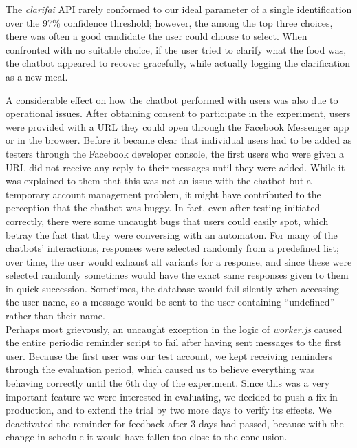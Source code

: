 The \textit{clarifai} API rarely conformed to our ideal parameter of a single identification over the 97\% confidence threshold; however, the among the top three choices, there was often a good candidate the user could choose to select. When confronted with no suitable choice, if the user tried to clarify what the food was, the chatbot appeared to recover gracefully, while actually logging the clarification as a new meal. 

A considerable effect on how the chatbot performed with users was also due to operational issues. After obtaining consent to participate in the experiment, users were provided with a URL they could open through the Facebook Messenger app or in the browser. Before it became clear that individual users had to be added as testers through the Facebook developer console, the first users who were given a URL did not receive any reply to their messages until they were added. While it was explained to them that this was not an issue with the chatbot but a temporary account management problem, it might have contributed to the perception that the chatbot was buggy. In fact, even after testing initiated correctly, there were some uncaught bugs that users could easily spot, which betray the fact that they were conversing with an automaton. For many of the chatbots' interactions, responses were selected randomly from a predefined list; over time, the user would exhaust all variants for a response, and since these were selected randomly sometimes would have the exact same responses given to them in quick succession. Sometimes, the database would fail silently when accessing the user name, so a message would be sent to the user containing ``undefined'' rather than their name. \\
Perhaps most grievously, an uncaught exception in the logic of \textit{worker.js} caused the entire periodic reminder script to fail after having sent messages to the first user. Because the first user was our test account, we kept receiving reminders through the evaluation period, which caused us to believe everything was behaving correctly until the 6th day of the experiment. Since this was a very important feature we were interested in evaluating, we decided to push a fix in production, and to extend the trial by two more days to verify its effects. We deactivated the reminder for feedback after 3 days had passed, because with the change in schedule it would have fallen too close to the conclusion. \\
